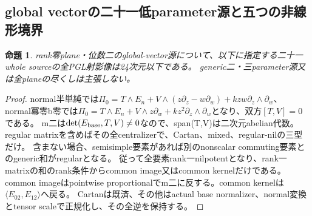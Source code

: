 \documentclass[a4paper,11pt]{ltjsarticle}
\newtheorem{proposition}{命題}[section]
\theoremstyle{definition}
\begin{document}
\subsection{global vectorの二十一低parameter源と五つの非線形境界}
\begin{proposition}\label{prop:plane-global-lowparameter-G}
rank零plane・位数二のglobal-vector源について、以下に指定する二十一whole sourceの全PGL射影像は24次元以下である。
generic二・三parameter源又は全planeの尽くしは主張しない。
\end{proposition}
\begin{proof}
normal半単純では$\Pi_0=T\wedge E_n+V\wedge(z\partial_z-w\partial_w)+kzw\partial_z\wedge\partial_w$、
normal冪零b零では$\Pi_0=T\wedge E_n+V\wedge z\partial_w+kz^2\partial_z\wedge\partial_w$となり、双方$[T,V]=0$である。
m二は$\det(E_{\rm base},T,V)\ne0$なので、span(T,V)は二次元abelian代数。
regular matrixを含めばその全centralizerで、Cartan、mixed、regular-nilの三型だけ。
含まない場合、semisimple要素があれば別のnonscalar commuting要素とのgeneric和がregularとなる。
従って全要素rank一nilpotentとなり、rank一matrixの和のrank条件からcommon image又はcommon kernelだけである。
common imageはpointwise proportionalでm二に反する。common kernelは$\langle E_{02},E_{12}\rangle$へ戻る。
Cartanは既済、その他はactual base normalizer、normal変換とtensor scaleで正規化し、その全逆を保持する。


\end{proof}
\end{document}
